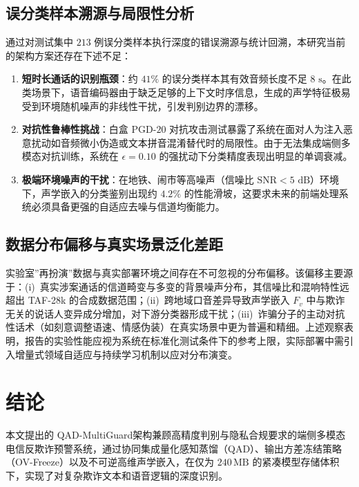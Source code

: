\documentclass[11pt, a4paper]{article}
\begin{document}
\subsection{误分类样本溯源与局限性分析}

通过对测试集中 $213$ 例误分类样本执行深度的错误溯源与统计回溯，本研究当前的架构方案还存在下述不足：

\begin{enumerate}
    \item \textbf{短时长通话的识别瓶颈}：约 $41\%$ 的误分类样本其有效音频长度不足 $8\text{ s}$。在此类场景下，语音编码器由于缺乏足够的上下文时序信息，生成的声学特征极易受到环境随机噪声的非线性干扰，引发判别边界的漂移。
    \item \textbf{对抗性鲁棒性挑战}：白盒 $\mathrm{PGD}\text{-}20$ 对抗攻击测试暴露了系统在面对人为注入恶意扰动如音频微小伪造或文本拼音混淆替代时的局限性。由于无法集成端侧多模态对抗训练，系统在 $\epsilon = 0.10$ 的强扰动下分类精度表现出明显的单调衰减。
    \item \textbf{极端环境噪声的干扰}：在地铁、闹市等高噪声（信噪比 $\mathrm{SNR} < 5\text{ dB}$）环境下，声学嵌入的分类鉴别出现约 $4.2\%$ 的性能滑坡，这要求未来的前端处理系统必须具备更强的自适应去噪与信道均衡能力。
\end{enumerate}

\subsection{数据分布偏移与真实场景泛化差距}

实验室”再扮演”数据与真实部署环境之间存在不可忽视的分布偏移。该偏移主要源于：(i)~真实涉案通话的信道畸变与多变的背景噪声分布，其信噪比和混响特性远超出 TAF-28k 的合成数据范围；(ii)~跨地域口音差异导致声学嵌入 $F_v$ 中与欺诈无关的说话人变异成分增加，对下游分类器形成干扰；(iii)~诈骗分子的主动对抗性话术（如刻意调整语速、情感伪装）在真实场景中更为普遍和精细。上述观察表明，报告的实验性能应视为系统在标准化测试条件下的参考上限，实际部署中需引入增量式领域自适应与持续学习机制以应对分布演变。

\section{结论}

本文提出的 QAD-MultiGuard架构兼顾高精度判别与隐私合规要求的端侧多模态电信反欺诈预警系统，通过协同集成量化感知蒸馏（QAD）、输出方差冻结策略（OV-Freeze）以及不可逆高维声学嵌入，在仅为 $240\,\mathrm{MB}$ 的紧凑模型存储体积下，实现了对复杂欺诈文本和语音逻辑的深度识别。
\end{document}
